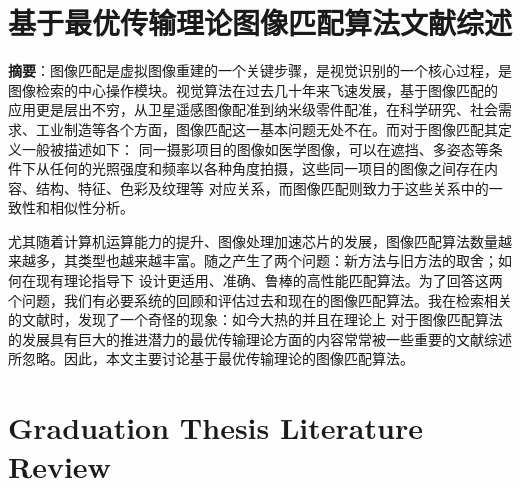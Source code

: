 \maketitle%
\intobmk\section*{基于最优传输理论图像匹配算法文献综述}%

\vspace*{10pt}
   
\thispagestyle{plain}
\setcounter{page}{1}%

\noindent
\textbf{摘要}：图像匹配是虚拟图像重建的一个关键步骤，是视觉识别的一个核心过程，是图像检索的中心操作模块。视觉算法在过去几十年来飞速发展，基于图像匹配的
应用更是层出不穷，从卫星遥感图像配准到纳米级零件配准，在科学研究、社会需求、工业制造等各个方面，图像匹配这一基本问题无处不在。而对于图像匹配其定义一般被描述如下：
同一摄影项目的图像如医学图像，可以在遮挡、多姿态等条件下从任何的光照强度和频率以各种角度拍摄，这些同一项目的图像之间存在内容、结构、特征、色彩及纹理等
对应关系，而图像匹配则致力于这些关系中的一致性和相似性分析。

尤其随着计算机运算能力的提升、图像处理加速芯片的发展，图像匹配算法数量越来越多，其类型也越来越丰富。随之产生了两个问题：新方法与旧方法的取舍；如何在现有理论指导下
设计更适用、准确、鲁棒的高性能匹配算法。为了回答这两个问题，我们有必要系统的回顾和评估过去和现在的图像匹配算法。我在检索相关的文献时，发现了一个奇怪的现象：如今大热的并且在理论上
对于图像匹配算法的发展具有巨大的推进潜力的最优传输理论方面的内容常常被一些重要的文献综述所忽略。因此，本文主要讨论基于最优传输理论的图像匹配算法。





\intobmk\section*{\textbf{Graduation Thesis Literature Review}}
\vspace*{20pt}

